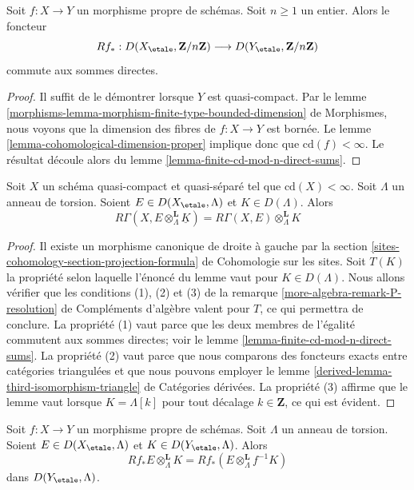 \begin{lemma}
\label{lemma-proper-mod-n-direct-sums}
Soit $f : X \to Y$ un morphisme propre de schémas. Soit $n \geq 1$
un entier. Alors le foncteur
$$
Rf_* :
D(X_\etale, \mathbf{Z}/n\mathbf{Z})
\longrightarrow
D(Y_\etale, \mathbf{Z}/n\mathbf{Z})
$$
commute aux sommes directes.
\end{lemma}

\begin{proof}
Il suffit de le démontrer lorsque $Y$ est quasi-compact. Par le
lemme \ref{morphisms-lemma-morphism-finite-type-bounded-dimension} de Morphismes,
nous voyons que la dimension des fibres de
$f : X \to Y$ est bornée.
Le lemme \ref{lemma-cohomological-dimension-proper}
implique donc que $\text{cd}(f) < \infty$. Le résultat
découle alors du lemme \ref{lemma-finite-cd-mod-n-direct-sums}.
\end{proof}

\begin{lemma}
\label{lemma-pull-out-constant-mod-n}
Soit $X$ un schéma quasi-compact et quasi-séparé
tel que $\text{cd}(X) < \infty$. Soit $\Lambda$ un anneau de torsion.
Soient $E \in D(X_\etale, \Lambda)$ et $K \in D(\Lambda)$. Alors
$$
R\Gamma(X, E \otimes_\Lambda^\mathbf{L} \underline{K}) =
R\Gamma(X, E) \otimes_\Lambda^\mathbf{L} K
$$
\end{lemma}

\begin{proof}
Il existe un morphisme canonique de droite à gauche par la
section \ref{sites-cohomology-section-projection-formula} de Cohomologie sur les sites.
Soit $T(K)$ la propriété selon laquelle l'énoncé du
lemme vaut pour $K \in D(\Lambda)$.
Nous allons vérifier que les conditions (1), (2) et (3) de la
remarque \ref{more-algebra-remark-P-resolution} de Compléments d'algèbre
valent pour $T$, ce qui permettra de conclure.
La propriété (1) vaut parce que les deux membres de l'égalité
commutent aux sommes directes; voir le
lemme \ref{lemma-finite-cd-mod-n-direct-sums}.
La propriété (2) vaut parce que nous comparons des foncteurs exacts
entre catégories triangulées et que nous pouvons employer le
lemme \ref{derived-lemma-third-isomorphism-triangle} de Catégories dérivées.
La propriété (3) affirme que le lemme vaut lorsque $K = \Lambda[k]$
pour tout décalage $k \in \mathbf{Z}$, ce qui est évident.
\end{proof}

\begin{lemma}
\label{lemma-projection-formula-proper-mod-n}
Soit $f : X \to Y$ un morphisme propre de schémas. Soit $\Lambda$
un anneau de torsion. Soient $E \in D(X_\etale, \Lambda)$ et
$K \in D(Y_\etale, \Lambda)$. Alors
$$
Rf_*E \otimes_\Lambda^\mathbf{L} K =
Rf_*(E \otimes_\Lambda^\mathbf{L} f^{-1}K)
$$
dans $D(Y_\etale, \Lambda)$.
\end{lemma}

